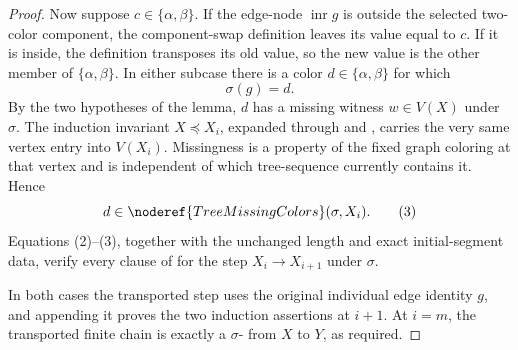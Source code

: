 \begin{proof}
Now suppose \(c\in\{\alpha,\beta\}\).  If the edge-node
\(\operatorname{inr}g\) is outside the selected two-color component, the
component-swap definition leaves its value equal to \(c\).  If it is
inside, the definition transposes its old value, so the new value is the
other member of \(\{\alpha,\beta\}\).  In either subcase there is a color
\(d\in\{\alpha,\beta\}\) for which
\[
                            \sigma(g)=d.                       \tag{2}
\]
By the two hypotheses of the lemma, \(d\) has a missing witness
\(w\in V(X)\) under \(\sigma\).  The induction invariant
\(X\preccurlyeq X_i\), expanded through
 and
, carries the very same vertex entry into
\(V(X_i)\).  Missingness is a property of the fixed graph coloring at
that vertex and is independent of which tree-sequence currently contains
it.  Hence
\[
                   d\in\noderef{TreeMissingColors}(\sigma,X_i). \tag{3}
\]
Equations (2)--(3), together with the unchanged length and exact
initial-segment data, verify every clause of
 for the step
\(X_i\to X_{i+1}\) under \(\sigma\).

In both cases the transported step uses the original individual edge
identity \(g\), and appending it proves the two induction assertions at
\(i+1\).  At \(i=m\), the transported finite chain is exactly a
\(\sigma\)- from \(X\) to \(Y\),
as required.
\end{proof}
